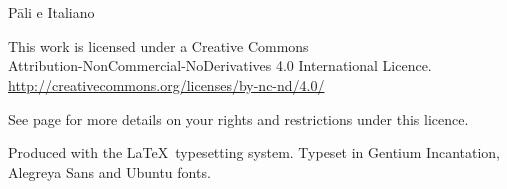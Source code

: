 
\thispagestyle{empty}

\enlargethispage{\baselineskip}

{\centering
\ifaivedition
\fontsize{12}{15}\selectfont
\else
\small
\fi
\setlength{\parskip}{15pt}

{\normalsize
\thetitle\\
\thesubtitle\\
Pāli e Italiano}

\vfill

This work is licensed under a Creative Commons\\
Attribution-NonCommercial-NoDerivatives 4.0 International Licence.\\
\href{http://creativecommons.org/licenses/by-nc-nd/4.0/}{http://creativecommons.org/licenses/by-nc-nd/4.0/}

See page \pageref{copyright-details} for more details on your rights and restrictions under this licence.

Produced with the \LaTeX\ typesetting system. Typeset in Gentium Incantation,\\
Alegreya Sans and Ubuntu fonts.

\theEditionInfo

}

